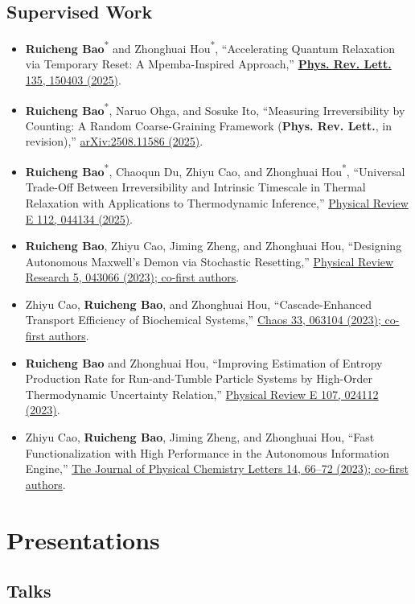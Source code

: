 \documentclass[10pt,a4paper]{article}
\newcommand{\pub}[4]{%
  \item #1, ``#2,'' \href{#4}{#3}.
}
\newcommand{\corr}[1]{#1\textsuperscript{*}}
\begin{document}
\newpage
\subsection{Supervised Work}

\begin{itemize}
  \pub{\corr{\textbf{Ruicheng Bao}} and \corr{Zhonghuai Hou}}{Accelerating Quantum Relaxation via Temporary Reset: A Mpemba-Inspired Approach}{\textbf{Phys. Rev. Lett.} 135, 150403 (2025)}{https://doi.org/10.1103/g94p-7421}
  \pub{\corr{\textbf{Ruicheng Bao}}, Naruo Ohga, and Sosuke Ito}{Measuring Irreversibility by Counting: A Random Coarse-Graining Framework (\textbf{Phys. Rev. Lett.}, in revision)}{arXiv:2508.11586 (2025)}{https://arxiv.org/abs/2508.11586}
  \pub{\corr{\textbf{Ruicheng Bao}}, Chaoqun Du, Zhiyu Cao, and \corr{Zhonghuai Hou}}{Universal Trade-Off Between Irreversibility and Intrinsic Timescale in Thermal Relaxation with Applications to Thermodynamic Inference}{Physical Review E 112, 044134 (2025)}{https://doi.org/10.1103/fmsz-rdbj}
  \pub{\textbf{Ruicheng Bao}, Zhiyu Cao, Jiming Zheng, and Zhonghuai Hou}{Designing Autonomous Maxwell's Demon via Stochastic Resetting}{Physical Review Research 5, 043066 (2023); co-first authors}{https://doi.org/10.1103/PhysRevResearch.5.043066}
  \pub{Zhiyu Cao, \textbf{Ruicheng Bao}, and Zhonghuai Hou}{Cascade-Enhanced Transport Efficiency of Biochemical Systems}{Chaos 33, 063104 (2023); co-first authors}{https://doi.org/10.1063/5.0146769}
  \pub{\textbf{Ruicheng Bao} and Zhonghuai Hou}{Improving Estimation of Entropy Production Rate for Run-and-Tumble Particle Systems by High-Order Thermodynamic Uncertainty Relation}{Physical Review E 107, 024112 (2023)}{https://doi.org/10.1103/PhysRevE.107.024112}
  \pub{Zhiyu Cao, \textbf{Ruicheng Bao}, Jiming Zheng, and Zhonghuai Hou}{Fast Functionalization with High Performance in the Autonomous Information Engine}{The Journal of Physical Chemistry Letters 14, 66--72 (2023); co-first authors}{https://doi.org/10.1021/acs.jpclett.2c03335}
\end{itemize}

\section{Presentations}

\subsection{Talks}
\end{document}
